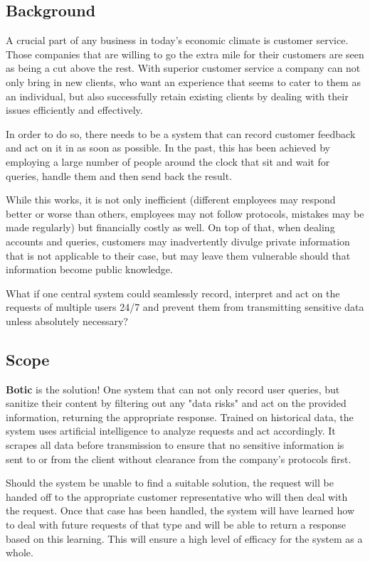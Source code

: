 \documentclass[11pt]{article}
\begin{document}
\subsection{Background}
A crucial part of any business in today's economic climate is customer service. Those companies that are willing to go the extra mile for their customers are seen as being a cut above the rest. With superior customer service a company can not only bring in new clients, who want an experience that seems to cater to them as an individual, but also successfully retain existing clients by dealing with their issues efficiently and effectively.\par
In order to do so, there needs to be a system that can record customer feedback and act on it in as soon as possible. In the past, this has been achieved by employing a large number of people around the clock that sit and wait for queries, handle them and then send back the result.\par

While this works, it is not only inefficient (different employees may respond better or worse than others, employees may not follow protocols, mistakes may be made regularly) but financially costly as well. On top of that, when dealing accounts and queries, customers may inadvertently divulge private information that is not applicable to their case, but may leave them vulnerable should that information become public knowledge.\par

What if one central system could seamlessly record, interpret and act on the requests of multiple users 24/7 and prevent them from transmitting sensitive data unless absolutely necessary?\par

\subsection{Scope}
\textbf{Botic} is the solution! One system that can not only record user queries, but sanitize their content by filtering out any "data risks" and act on the provided information, returning the appropriate response. Trained on historical data, the system uses artificial intelligence to analyze requests and act accordingly. It scrapes all data before transmission to ensure that no sensitive information is sent to or from the client without clearance from the company's protocols first.\par

Should the system be unable to find a suitable solution, the request will be handed off to the appropriate customer representative who will then deal with the request. Once that case has been handled, the system will have learned how to deal with future requests of that type and will be able to return a response based on this learning. This will ensure a high level of efficacy for the system as a whole.\par
\end{document}
